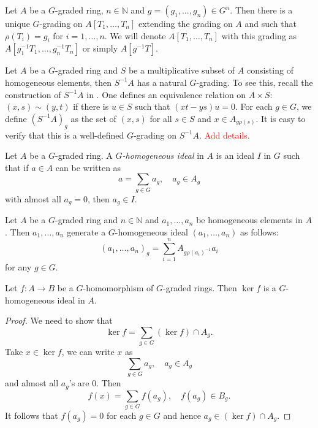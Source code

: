 \begin{example}
    Let $A$ be a $G$-graded ring, $n\in \mathbb{N}$ and $g=(g_1,\ldots,g_n)\in G^n$. Then there is a unique $G$-grading on $A[T_1,\ldots,T_n]$ extending the grading on $A$ and such that $\rho(T_i)=g_i$ for $i=1,\ldots,n$. We will denote $A[T_1,\ldots,T_n]$ with this grading as $A[g_{1}^{-1}T_1,\ldots,g_{n}^{-1}T_n]$ or simply $A[g^{-1}T]$.
\end{example}

\begin{example}\label{ex-localizationgradedring}
    Let $A$ be a $G$-graded ring and $S$ be a multiplicative subset of $A$ consisting of homogeneous elements, then $S^{-1}A$ has a natural $G$-grading. To see this, recall the construction of $S^{-1}A$ in \cite[\href{https://stacks.math.columbia.edu/tag/00CM}{Tag 00CM}]{stacks-project}. One defines an equivalence relation on $A\times S$: $(x,s)\sim (y,t)$ if there is $u\in S$ such that $(xt-ys)u=0$. For each $g\in G$, we define $(S^{-1}A)_g$ as the set of $(x,s)$ for all $s\in S$ and $x\in A_{g\rho(s)}$. It is easy to verify that this is a well-defined $G$-grading on $S^{-1}A$.  \textcolor{red}{Add details.}
\end{example}

\begin{definition}
    Let $A$ be a $G$-graded ring. A \emph{$G$-homogeneous ideal} in $A$ is an ideal $I$ in $G$ such that if $a\in A$ can be written as 
    \[
        a=\sum_{g\in G} a_g,\quad a_g\in A_g  
    \]
    with almost all $a_g=0$, then $a_g\in I$.
\end{definition}
\begin{example}\label{ex-homogeneousidealgeneratedbyelements}
    Let $A$ be a $G$-graded ring and $n\in \mathbb{N}$ and $a_1,\ldots,a_n$ be homogeneous elements in $A$. Then $a_1,\ldots,a_n$ generate a $G$-homogeneous ideal $(a_1,\ldots,a_n)$ as follows:
    \[
        (a_1,\ldots,a_n)_g=\sum_{i=1}^n A_{g \rho(a_i)^{-1}}a_i
    \]
    for any $g\in G$.
\end{example}


\begin{lemma}\label{lma-kernelghomogeneous}
    Let $f:A\rightarrow B$ be a $G$-homomorphism of $G$-graded rings. Then $\ker f$ is a $G$-homogeneous ideal in $A$.
\end{lemma}
\begin{proof}
    We need to show that
    \[
        \ker f=\sum_{g\in G} (\ker f)\cap A_g.  
    \]
    Take $x\in \ker f$, we can write $x$ as 
    \[
        \sum_{g\in G} a_g,\quad a_g\in A_g
    \]
    and almost all $a_g$'s are $0$. Then 
    \[
        f(x)=  \sum_{g\in G} f(a_g),\quad f(a_g)\in B_g.
    \]
    It follows that $f(a_g)=0$ for each $g\in G$ and hence $a_g\in (\ker f)\cap A_g$.
\end{proof}

